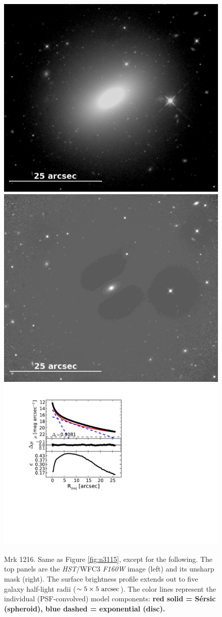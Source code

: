 \documentclass[useAMS,usenatbib,article]{mnras}
\begin{document}
\begin{figure}
\begin{center}
\includegraphics[width=0.49\columnwidth]{mrk1216_image.jpeg}
\includegraphics[width=0.49\columnwidth]{mrk1216_unsharp.jpeg} \\
\includegraphics[width=1.05\columnwidth]{mrk1216_decomposition.pdf}
\caption{Mrk 1216. 
Same as Figure \ref{fig:n3115}, except for the following. 
The top panels are the \emph{HST}/WFC3 \emph{F160W} image (left) and its unsharp mask (right).
The surface brightness profile extends out to five galaxy half-light radii ($\sim 5 \times 5~\rm arcsec$). 
The color lines represent the individual (PSF-convolved) model components:
{\bf red solid = S\'ersic (spheroid), blue dashed = exponential (disc). }
}
\label{fig:m1216}
\end{center}
\end{figure}
\end{document}

